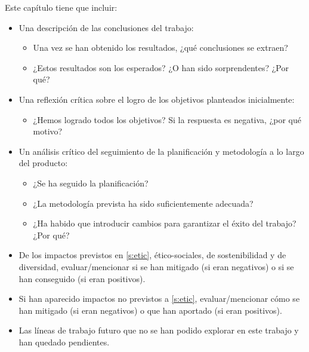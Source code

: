 \documentclass[ENG, BIB]{TFUOC}%
\begin{document}
Este capítulo tiene que incluir:
\begin{itemize}
\item Una descripción de las conclusiones del trabajo:
\begin{itemize}
    \item Una vez se han obtenido los resultados, ¿qué conclusiones se extraen?
    \item ¿Estos resultados son los esperados? ¿O han sido sorprendentes? ¿Por qué? 
\end{itemize}
\item Una reflexión crítica sobre el logro de los objetivos planteados inicialmente:
\begin{itemize}
    \item ¿Hemos logrado todos los objetivos? Si la respuesta es negativa, ¿por qué motivo?
\end{itemize}
\item Un análisis crítico del seguimiento de la planificación y metodología a lo largo del producto:
\begin{itemize}
    \item ¿Se ha seguido la planificación?
    \item ¿La metodología prevista ha sido suficientemente adecuada?
    \item ¿Ha habido que introducir cambios para garantizar el éxito del trabajo? ¿Por qué? 
\end{itemize}
\item De los impactos previstos en \ref{s:etic}, ético-sociales, de sostenibilidad y de diversidad, evaluar/mencionar si se han mitigado (si eran negativos) o si se han conseguido (si eran positivos). 
\item Si han aparecido impactos no previstos a \ref{s:etic}, evaluar/mencionar cómo se han mitigado (si eran negativos) o que han aportado (si eran positivos).
\item Las líneas de trabajo futuro que no se han podido explorar en este trabajo y han quedado pendientes.


\end{itemize}
\end{document}
